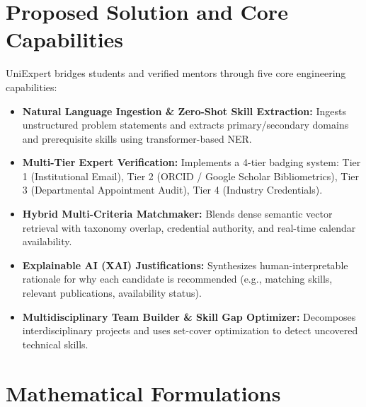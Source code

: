 \documentclass[11pt,a4paper]{article}
\begin{document}
\section{Proposed Solution and Core Capabilities}

UniExpert bridges students and verified mentors through five core engineering capabilities:
\begin{itemize}[leftmargin=*,noitemsep]
    \item \textbf{Natural Language Ingestion \& Zero-Shot Skill Extraction:} Ingests unstructured problem statements and extracts primary/secondary domains and prerequisite skills using transformer-based NER.
    \item \textbf{Multi-Tier Expert Verification:} Implements a 4-tier badging system: Tier 1 (Institutional Email), Tier 2 (ORCID / Google Scholar Bibliometrics), Tier 3 (Departmental Appointment Audit), Tier 4 (Industry Credentials).
    \item \textbf{Hybrid Multi-Criteria Matchmaker:} Blends dense semantic vector retrieval with taxonomy overlap, credential authority, and real-time calendar availability.
    \item \textbf{Explainable AI (XAI) Justifications:} Synthesizes human-interpretable rationale for why each candidate is recommended (e.g., matching skills, relevant publications, availability status).
    \item \textbf{Multidisciplinary Team Builder \& Skill Gap Optimizer:} Decomposes interdisciplinary projects and uses set-cover optimization to detect uncovered technical skills.
\end{itemize}

\section{Mathematical Formulations}
\end{document}
